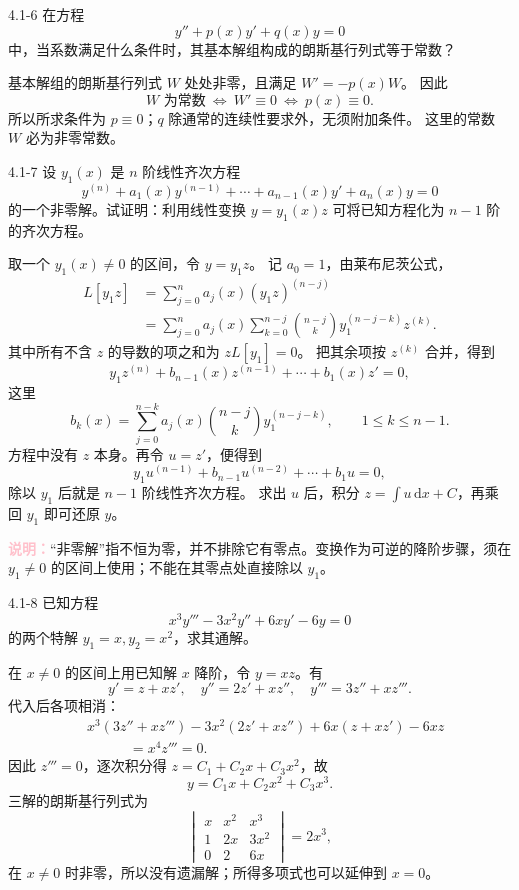 \documentclass[UTF8,a4paper,11pt]{ctexart}
\newcommand{\dd}{\,\mathrm d}
\newcommand{\note}[1]{\par\smallskip\noindent\textcolor{pink}{\bfseries 说明：}#1\par\smallskip}
\begin{document}
\begin{problem}{4.1-6}
在方程
  \[
    y''+p(x)y'+q(x)y=0
  \]
  中，当系数满足什么条件时，其基本解组构成的朗斯基行列式等于常数？
\end{problem}

\begin{solution}
基本解组的朗斯基行列式 $W$ 处处非零，且满足 $W'=-p(x)W$。
因此
\[
W\text{ 为常数}\ \Longleftrightarrow\ W'\equiv0
\ \Longleftrightarrow\ p(x)\equiv0.
\]
所以所求条件为 $\boxed{p\equiv0}$；$q$ 除通常的连续性要求外，无须附加条件。
这里的常数 $W$ 必为非零常数。
\end{solution}

\begin{problem}{4.1-7}
设 $y_1(x)$ 是 $n$ 阶线性齐次方程
  \[
    y^{(n)}+a_1(x)y^{(n-1)}+\cdots+a_{n-1}(x)y'+a_n(x)y=0
  \]
  的一个非零解。试证明：利用线性变换 $y=y_1(x)z$ 可将已知方程化为 $n-1$ 阶的齐次方程。
\end{problem}

\begin{solution}
取一个 $y_1(x)\ne0$ 的区间，令 $y=y_1z$。
记 $a_0=1$，由莱布尼茨公式，
\[
\begin{aligned}
L[y_1z]
&=\sum_{j=0}^na_j(x)(y_1z)^{(n-j)}\\
&=\sum_{j=0}^na_j(x)\sum_{k=0}^{n-j}
\binom{n-j}{k}y_1^{(n-j-k)}z^{(k)}.
\end{aligned}
\]
其中所有不含 $z$ 的导数的项之和为 $zL[y_1]=0$。
把其余项按 $z^{(k)}$ 合并，得到
\[
y_1z^{(n)}+b_{n-1}(x)z^{(n-1)}+\cdots+b_1(x)z'=0,
\]
这里
\[
b_k(x)=\sum_{j=0}^{n-k}a_j(x)\binom{n-j}{k}y_1^{(n-j-k)},
\qquad 1\le k\le n-1.
\]
方程中没有 $z$ 本身。再令 $u=z'$，便得到
\[
\boxed{y_1u^{(n-1)}+b_{n-1}u^{(n-2)}+\cdots+b_1u=0,}
\]
除以 $y_1$ 后就是 $n-1$ 阶线性齐次方程。
求出 $u$ 后，积分 $z=\int u\dd x+C$，再乘回 $y_1$ 即可还原 $y$。
\note{“非零解”指不恒为零，并不排除它有零点。变换作为可逆的降阶步骤，须在 $y_1\ne0$ 的区间上使用；不能在其零点处直接除以 $y_1$。}
\end{solution}

\begin{problem}{4.1-8}
已知方程
  \[
    x^3y'''-3x^2y''+6xy'-6y=0
  \]
  的两个特解 $y_1=x,y_2=x^2$，求其通解。
\end{problem}

\begin{solution}
在 $x\ne0$ 的区间上用已知解 $x$ 降阶，令 $y=xz$。有
\[
y'=z+xz',\quad y''=2z'+xz'',\quad y'''=3z''+xz'''.
\]
代入后各项相消：
\[
\begin{aligned}
&x^3(3z''+xz''')-3x^2(2z'+xz'')
+6x(z+xz')-6xz\\
&\hspace{3em}=x^4z'''=0.
\end{aligned}
\]
因此 $z'''=0$，逐次积分得 $z=C_1+C_2x+C_3x^2$，故
\[
\boxed{y=C_1x+C_2x^2+C_3x^3.}
\]
三解的朗斯基行列式为
\[
\begin{vmatrix}x&x^2&x^3\\1&2x&3x^2\\0&2&6x\end{vmatrix}=2x^3,
\]
在 $x\ne0$ 时非零，所以没有遗漏解；所得多项式也可以延伸到 $x=0$。
\end{solution}
\end{document}
